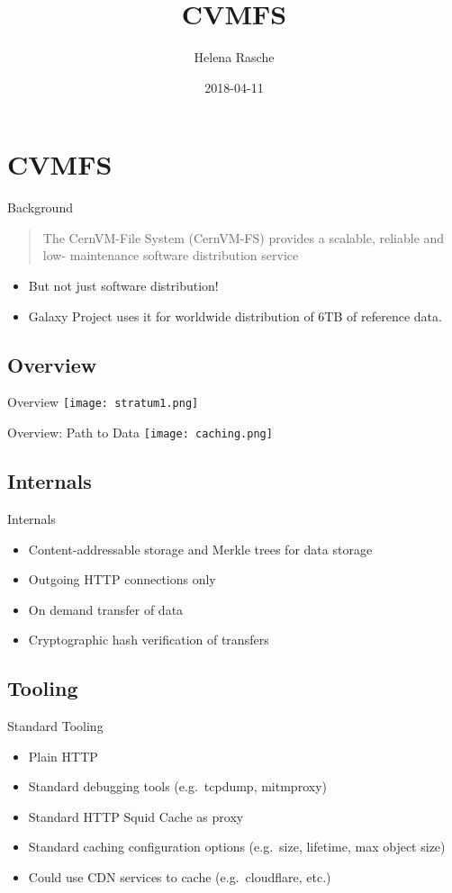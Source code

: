 \documentclass[12pt]{ufrslides}
\title[CVMFS]{CVMFS}
\author{Helena Rasche}
\date{2018-04-11}
\begin{document}
\frame{\titlepage}

\section{CVMFS}
\begin{frame}{Background}
	\begin{quote}
	The CernVM-File System (CernVM-FS) provides a scalable, reliable and low- maintenance software distribution service
	\end{quote}

	\begin{itemize}
		\item But not just software distribution!
		\item Galaxy Project uses it for worldwide distribution of 6TB of reference data.
	\end{itemize}
\end{frame}

\subsection{Overview}
\begin{frame}{Overview}
	\texttt{[image: stratum1.png]}
\end{frame}

\begin{frame}{Overview: Path to Data}
	\texttt{[image: caching.png]}
\end{frame}

\subsection{Internals}
\begin{frame}{Internals}
	\begin{itemize}
		\item Content-addressable storage and Merkle trees for data storage
		\item Outgoing HTTP connections only
		\item On demand transfer of data
		\item Cryptographic hash verification of transfers
	\end{itemize}
\end{frame}

\subsection{Tooling}
\begin{frame}{Standard Tooling}
	\begin{itemize}
		\item Plain HTTP
		\item Standard debugging tools (e.g.~tcpdump, mitmproxy)
		\item Standard HTTP Squid Cache as proxy
		\item Standard caching configuration options (e.g.~size, lifetime, max object size)
		\item Could use CDN services to cache (e.g.~cloudflare, etc.)
	\end{itemize}
\end{frame}
\end{document}
